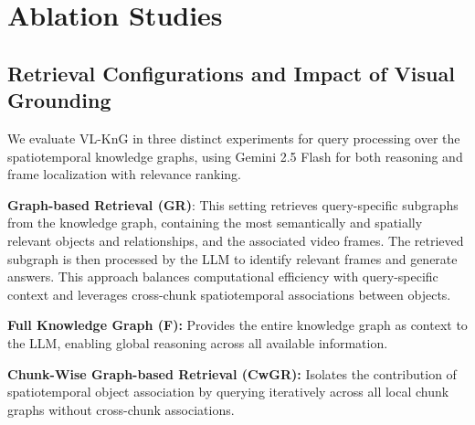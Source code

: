 \section{Ablation Studies}

\subsection{Retrieval Configurations and Impact of Visual Grounding }

We evaluate VL-KnG in three distinct experiments for query processing over the spatiotemporal knowledge graphs, using Gemini 2.5 Flash for both reasoning and frame localization with relevance ranking.

\textbf{Graph-based Retrieval (GR)}: This setting retrieves query-specific subgraphs from the knowledge graph, containing the most semantically and spatially relevant objects and relationships, and the associated video frames. The retrieved subgraph is then processed by the LLM to identify relevant frames and generate answers. This approach balances computational efficiency with query-specific context and leverages cross-chunk spatiotemporal associations between objects.

\textbf{Full Knowledge Graph (F):} Provides the entire knowledge graph as context to the LLM, enabling global reasoning across all available information.   

\textbf{Chunk-Wise Graph-based Retrieval (CwGR):} Isolates the contribution of spatiotemporal object association by querying iteratively across all local chunk graphs without cross-chunk associations.


